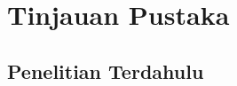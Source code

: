 \chapter{Tinjauan Pustaka}\label{ch:literature}

    \section{Penelitian Terdahulu}\label{sec:past research}

